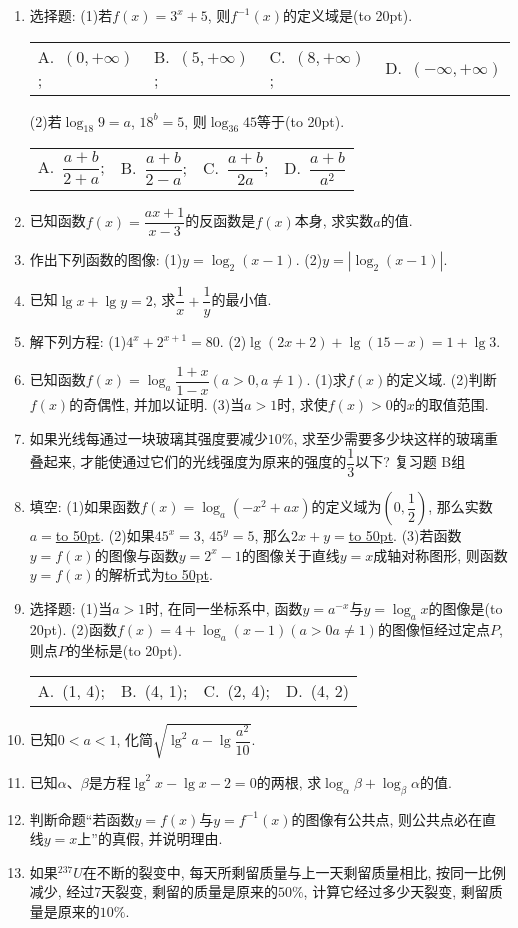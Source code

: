 \documentclass[10pt,a4paper]{article}
\newcommand{\blank}[1]{\underline{\hbox to #1pt{}}}
\newcommand{\bracket}[1]{(\hbox to #1pt{})}
\newcommand{\fourch}[4]{\par\begin{tabular}{p{.23\textwidth}p{.23\textwidth}p{.23\textwidth}p{.23\textwidth}}
A.~#1 &B.~#2& C.~#3& D.~#4
\end{tabular}}
\begin{document}
\begin{enumerate}[1.]
\blank{50}.
\item 选择题:
(1)若$f(x)=3^x+5$, 则$f^{-1}(x)$的定义域是\bracket{20}.
\fourch{$(0,+\infty)$;}{$(5,+\infty)$;}{$(8,+\infty)$;}{$(-\infty ,+\infty)$}
(2)若$\log _{18}9=a$, $18^b=5$, 则$\log _{36}45$等于\bracket{20}.
\fourch{$\dfrac{a+b}{2+a}$;}{$\dfrac{a+b}{2-a}$;}{$\dfrac{a+b}{2a}$;}{$\dfrac{a+b}{a^2}$}
\item 已知函数$f(x)=\dfrac{ax+1}{x-3}$的反函数是$f(x)$本身, 求实数$a$的值.
\item 作出下列函数的图像:
(1)$y=\log _2(x-1)$.					(2)$y=|\log _2(x-1)|$.
\item 已知$\lg x+\lg y=2$, 求$\dfrac 1x+\dfrac 1y$的最小值.
\item 解下列方程:
(1)$4^x+2^{x+1}=80$.					(2)$\lg (2x+2)+\lg (15-x)=1+\lg 3$.
\item 已知函数$f(x)=\log _a\dfrac{1+x}{1-x}(a>0,a\ne 1)$.
(1)求$f(x)$的定义域.
(2)判断$f(x)$的奇偶性, 并加以证明.
(3)当$a>1$时, 求使$f(x)>0$的$x$的取值范围.
\item 如果光线每通过一块玻璃其强度要减少$10\%$, 求至少需要多少块这样的玻璃重叠起来, 才能使通过它们的光线强度为原来的强度的$\dfrac 13$以下?
复习题
B组
\item 填空:
(1)如果函数$f(x)=\log _a(-x^2+ax)$的定义域为$(0,\dfrac 12)$, 那么实数$a=$\blank{50}.
(2)如果$45^x=3$, $45^y=5$, 那么$2x+y=$\blank{50}.
(3)若函数$y=f(x)$的图像与函数$y=2^x-1$的图像关于直线$y=x$成轴对称图形, 则函数$y=f(x)$的解析式为\blank{50}.
\item 选择题:
(1)当$a>1$时, 在同一坐标系中, 函数$y=a^{-x}$与$y=\log _ax$的图像是\bracket{20}.
(2)函数$f(x)=4+\log _a(x-1)(a>0a\ne 1)$的图像恒经过定点$P$, 则点$P$的坐标是\bracket{20}.
\fourch{(1, 4);}{(4, 1);}{(2, 4);}{(4, 2)}
\item 已知$0<a<1$, 化简$\sqrt {\lg ^2a-\lg \dfrac{a^2}{10}}$.
\item 已知$\alpha$、$\beta$是方程$\lg ^2x-\lg x-2=0$的两根, 求$\log _{\alpha }\beta +\log _{\beta }\alpha$的值.
\item 判断命题``若函数$y=f(x)$与$y=f^{-1}(x)$的图像有公共点, 则公共点必在直线$y=x$上''的真假, 并说明理由.
\item 如果$^{237}U$在不断的裂变中, 每天所剩留质量与上一天剩留质量相比, 按同一比例减少, 经过7天裂变, 剩留的质量是原来的$50\%$, 计算它经过多少天裂变, 剩留质量是原来的$10\%$.


\end{enumerate}
\end{document}

